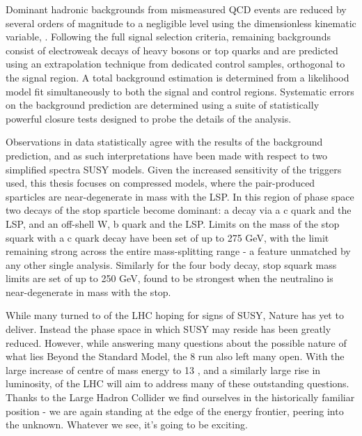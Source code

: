 Dominant hadronic backgrounds from mismeasured QCD events are reduced by
several orders of magnitude to a negligible level using the dimensionless
kinematic variable, \alphat. Following the full signal selection criteria,
remaining backgrounds consist of electroweak decays of
heavy bosons or top quarks and are predicted using an extrapolation technique
from dedicated control samples,
orthogonal to the signal region. A total background estimation is determined
from a likelihood model fit simultaneously to both the signal and control
regions. Systematic errors on the background prediction are determined using a
suite of statistically powerful closure tests designed to probe the details of
the analysis.

Observations in data statistically agree with the results of the background
prediction, and as such interpretations have been made with respect to two
simplified spectra SUSY models. Given the increased sensitivity of the triggers
used, this thesis focuses on compressed models, where
the pair-produced sparticles are near-degenerate in mass with the LSP. In this
region of
phase space two decays of the stop sparticle become dominant: a
decay via a c quark and the LSP, and an off-shell W, b quark and the LSP.
Limits on the mass of the stop squark with a c quark decay have been set
of up to 275 GeV, with the limit remaining strong across the entire
mass-splitting
range - a feature unmatched by any other single analysis. Similarly for the four
body decay, stop squark mass limits are set of up to 250 GeV, found to be
strongest when the neutralino is near-degenerate in mass with the stop.

While many turned to \runone of the LHC hoping for signs of SUSY,
Nature has yet to deliver. Instead the phase space in which SUSY may
reside has been greatly reduced. However, while answering many questions about
the possible nature of what lies Beyond the Standard Model, the 8
\tev run also left many open. With the large increase of centre of mass energy
to 13 \tev, and a similarly large rise in luminosity, \runtwo of the LHC will
aim to address many of these outstanding questions. Thanks to the Large Hadron
Collider we find ourselves in the historically familiar position - we are again
standing at the edge of the energy frontier, peering into the unknown. Whatever
we see, it's going to be exciting.
